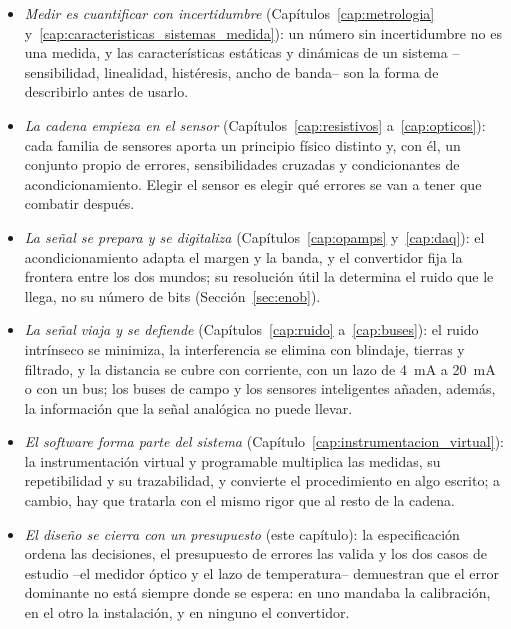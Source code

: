 \begin{itemize}
    \item \emph{Medir es cuantificar con incertidumbre} (Capítulos~\ref{cap:metrologia} y~\ref{cap:caracteristicas_sistemas_medida}): un número sin incertidumbre no es una medida, y las características estáticas y dinámicas de un sistema --sensibilidad, linealidad, histéresis, ancho de banda-- son la forma de describirlo antes de usarlo.
    \item \emph{La cadena empieza en el sensor} (Capítulos~\ref{cap:resistivos} a~\ref{cap:opticos}): cada familia de sensores aporta un principio físico distinto y, con él, un conjunto propio de errores, sensibilidades cruzadas y condicionantes de acondicionamiento. Elegir el sensor es elegir qué errores se van a tener que combatir después.
    \item \emph{La señal se prepara y se digitaliza} (Capítulos~\ref{cap:opamps} y~\ref{cap:daq}): el acondicionamiento adapta el margen y la banda, y el convertidor fija la frontera entre los dos mundos; su resolución útil la determina el ruido que le llega, no su número de bits (Sección~\ref{sec:enob}).
    \item \emph{La señal viaja y se defiende} (Capítulos~\ref{cap:ruido} a~\ref{cap:buses}): el ruido intrínseco se minimiza, la interferencia se elimina con blindaje, tierras y filtrado, y la distancia se cubre con corriente, con un lazo de \SI{4}{\milli\ampere} a \SI{20}{\milli\ampere} o con un bus; los buses de campo y los sensores inteligentes añaden, además, la información que la señal analógica no puede llevar.
    \item \emph{El software forma parte del sistema} (Capítulo~\ref{cap:instrumentacion_virtual}): la instrumentación virtual y programable multiplica las medidas, su repetibilidad y su trazabilidad, y convierte el procedimiento en algo escrito; a cambio, hay que tratarla con el mismo rigor que al resto de la cadena.
    \item \emph{El diseño se cierra con un presupuesto} (este capítulo): la especificación ordena las decisiones, el presupuesto de errores las valida y los dos casos de estudio --el medidor óptico y el lazo de temperatura-- demuestran que el error dominante no está siempre donde se espera: en uno mandaba la calibración, en el otro la instalación, y en ninguno el convertidor.
\end{itemize}

